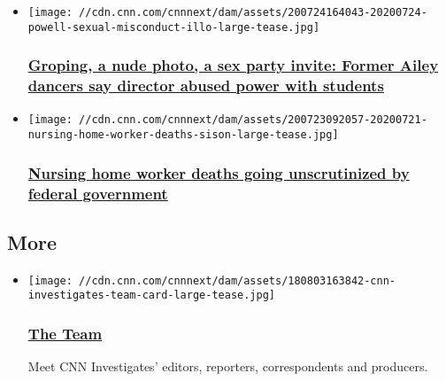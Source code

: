 \begin{itemize}
\item
  \href{/2020/07/25/us/alvin-ailey-dance-school-troy-powell-investigation-invs/index.html}{}

  \texttt{[image: //cdn.cnn.com/cnnnext/dam/assets/200724164043-20200724-powell-sexual-misconduct-illo-large-tease.jpg]}

  \hypertarget{groping-a-nude-photo-a-sex-party-invite-former-ailey-dancers-say-director-abused-power-with-students}{%
  \subsubsection{\texorpdfstring{\href{/2020/07/25/us/alvin-ailey-dance-school-troy-powell-investigation-invs/index.html}{Groping,
  a nude photo, a sex party invite: Former Ailey dancers say director
  abused power with
  students}}{Groping, a nude photo, a sex party invite: Former Ailey dancers say director abused power with students}}\label{groping-a-nude-photo-a-sex-party-invite-former-ailey-dancers-say-director-abused-power-with-students}}
\item
  \href{/2020/07/23/us/nursing-home-worker-death-investigations-osha-invs/index.html}{}

  \texttt{[image: //cdn.cnn.com/cnnnext/dam/assets/200723092057-20200721-nursing-home-worker-deaths-sison-large-tease.jpg]}

  \hypertarget{nursing-home-worker-deaths-going-unscrutinized-by-federal-government-}{%
  \subsubsection{\texorpdfstring{\href{/2020/07/23/us/nursing-home-worker-death-investigations-osha-invs/index.html}{Nursing
  home worker deaths going unscrutinized by federal government
  }}{Nursing home worker deaths going unscrutinized by federal government }}\label{nursing-home-worker-deaths-going-unscrutinized-by-federal-government-}}
\end{itemize}

\hypertarget{more-}{%
\subsection{More~}\label{more-}}

\begin{itemize}
\item
  \href{/specials/cnn-investigates-team}{}

  \texttt{[image: //cdn.cnn.com/cnnnext/dam/assets/180803163842-cnn-investigates-team-card-large-tease.jpg]}

  \hypertarget{the-team}{%
  \subsubsection{\texorpdfstring{\href{/specials/cnn-investigates-team}{The
  Team}}{The Team}}\label{the-team}}

  Meet CNN Investigates' editors, reporters, correspondents and
  producers.
\end{itemize}

